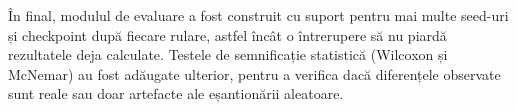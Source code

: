 În final, modulul de evaluare a fost construit cu suport pentru mai multe seed-uri și checkpoint după fiecare rulare, astfel încât o întrerupere să nu piardă rezultatele deja calculate. Testele de semnificație statistică (Wilcoxon și McNemar) au fost adăugate ulterior, pentru a verifica dacă diferențele observate sunt reale sau doar artefacte ale eșantionării aleatoare.

\afterpage{\blankpage}
